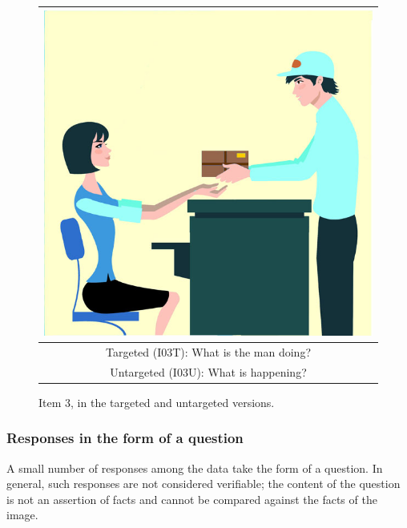 \documentclass[12pt,notitlepage]{article}
\begin{document}
\begin{figure}[h]
\begin{center}
\begin{tabular}{|c|}
\hline
\includegraphics[width=0.4\columnwidth,trim=0 0 0 -3]{figures/I03.jpg}\\
\hline
Targeted (I03T): What is the man doing?\\
\hline
Untargeted (I03U): What is happening? \\
\hline
\end{tabular}
\end{center}
\caption{Item 3, in the targeted and untargeted versions.}
\label{fig:deliver-package}
\end{figure}

\subsubsection{Responses in the form of a question} \label{subsubsec:verif-question} A small number of responses among the data take the form of a question. In general, such responses are not considered verifiable; the content of the question is not an assertion of facts and cannot be compared against the facts of the image. 
\end{document}
